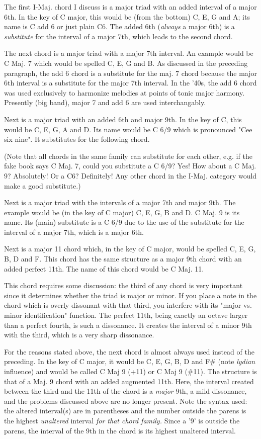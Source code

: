 The first I-Maj. chord I discuss is a major triad with an added interval 
of a major 6th. In the key of C major, this would be (from the bottom) 
C, E, G and A; its name is C add 6 or just plain C6. The added 6th (\emph{always} 
a major 6th) is a \emph{substitute} for the interval of a major 7th, which leads 
to the second chord.

The next chord is a major triad with a major 7th interval. An example 
would be C Maj. 7 which would be spelled C, E, G and B. As discussed in 
the preceding paragraph, the add 6 chord is a substitute for the maj. 7 
chord because the major 6th interval is a substitute for the major 7th 
interval. In the '40s, the add 6 chord was used exclusively to harmonize 
melodies at points of tonic major harmony. Presently (big band), major 7 
and add 6 are used interchangably. 

Next is a major triad with an added 6th and major 9th. In the key of C, 
this would be C, E, G, A and D. Its name would be C 6/9 which is 
pronounced "Cee six nine". It substitutes for the following chord.

(Note that all chords in the same family can substitute for each other, 
e.g. if the fake book says C Maj. 7, could you substitute a C 6/9? Yes! 
How about a C Maj. 9? Absolutely! Or a C6? Definitely! Any other chord in 
the I-Maj. category would make a good substitute.)

Next is a major triad with the intervals of a major 7th and major 9th. 
The example would be (in the key of C major) C, E, G, B and D. C Maj. 9 
is its name. Its (main) substitute is a C 6/9 due to the use of the
substitute for the interval of a major 7th, which is a major 6th.

Next is a major 11 chord which, in the key of C major, would be spelled 
C, E, G, B, D and F. This chord has the same structure as a major 9th 
chord with an added perfect 11th. The name of this chord would be C Maj. 11. 

This chord requires some discussion: the third of any chord is very 
important since it determines whether the triad is major or minor. 
If you place a note in the chord which is overly dissonant with that 
third, you interfere with its "major vs. minor identification" function. 
The perfect 11th, being exactly an octave larger than a perfect fourth, 
is such a dissonance. It creates the interval of a minor 9th with the 
third, which is a very sharp dissonance.

For the reasons stated above, the next chord is almost always used instead of 
the preceding. In the key of C major, it would be C, E, G, B, D and F\# (note 
\emph{lydian} influence) and would be called C Maj 9 (+11) or C Maj 9 (\#11).
The structure is that of a Maj. 9 chord with an added augmented 11th.
Here, the interval created between the third and the 11th of the chord is 
a \emph{major} 9th, a mild dissonance, and the problems discussed above are no 
longer present. Note the syntax used: the altered interval(s) are in 
parentheses and the number outside the parens is the highest \emph{unaltered} 
interval \emph{for that chord family.} Since a '9' is outside the parens, the 
interval of the 9th in the chord is its highest unaltered interval.


